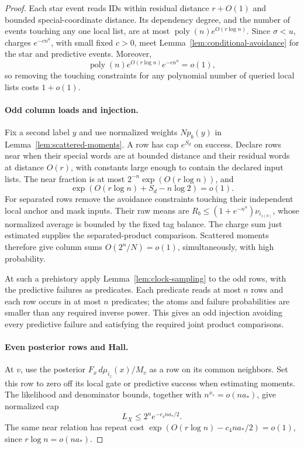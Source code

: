 \begin{proof}
Each star event reads IDs within residual distance \(r+O(1)\) and bounded special-coordinate distance. Its dependency degree, and the number of events touching any one local list, are at most
\(\operatorname{poly}(n)e^{O(r\log n)}\).
Since \(\sigma<u\), charges \(e^{-c n^u}\), with small fixed \(c>0\), meet Lemma~\ref{lem:conditional-avoidance} for the star and predictive events. Moreover,
\[
 \operatorname{poly}(n)e^{O(r\log n)}e^{-c n^u}=o(1),
\]
so removing the touching constraints for any polynomial number of queried local lists costs \(1+o(1)\).

\paragraph{Odd column loads and injection.}
Fix a second label \(y\) and use normalized weights \(Np_b(y)\) in Lemma~\ref{lem:scattered-moments}. A row has cap \(e^{S_d}\) on success. Declare rows near when their special words are at bounded distance and their residual words at distance \(O(r)\), with constants large enough to contain the declared input lists. The near fraction is at most \(2^{-n}\exp(O(r\log n))\), and
\[
 \exp(O(r\log n)+S_d-n\log2)=o(1).
\]
For separated rows remove the avoidance constraints touching their independent local anchor and mask inputs. Their raw means are \(R_b\le(1+e^{-n^u})\nu_{i_{z(b)}}\), whose normalized average is bounded by the fixed tag balance. The charge sum just estimated supplies the separated-product comparison. Scattered moments therefore give column sums \(O(2^n/N)=o(1)\), simultaneously, with high probability.

At such a prehistory apply Lemma~\ref{lem:clock-sampling} to the odd rows, with the predictive failures as predicates. Each predicate reads at most \(n\) rows and each row occurs in at most \(n\) predicates; the atoms and failure probabilities are smaller than any required inverse power. This gives an odd injection avoiding every predictive failure and satisfying the required joint product comparisons.

\paragraph{Even posterior rows and Hall.}
At \(v\), use the posterior \(F_x\,d\mu_{i_z}(x)/M_v\) as a row on its common neighbors. Set this row to zero off its local gate or predictive success when estimating moments. The likelihood and denominator bounds, together with \(n^{x_s}=o(na_*)\), give normalized cap
\[
 L_X\le2^n e^{-c_4na_*/2}.
\]
The same near relation has repeat cost
\(\exp(O(r\log n)-c_4na_*/2)=o(1)\),
since \(r\log n=o(na_*)\).


\end{proof}
